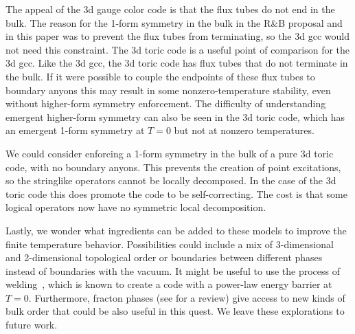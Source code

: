 The appeal of the 3d gauge color code is that the flux tubes do not end in the bulk.
The reason for the 1-form symmetry in the bulk in the R\&B proposal and in this paper was to prevent the flux tubes from terminating, so the 3d gcc would not need this constraint.
The 3d toric code is a useful point of comparison for the 3d gcc.
Like the 3d gcc, the 3d toric code has flux tubes that do not terminate in the bulk.
If it were possible to couple the endpoints of these flux tubes to boundary anyons this may result in some nonzero-temperature stability, even without higher-form symmetry enforcement. The difficulty of understanding emergent higher-form symmetry can also be seen in the 3d toric code, which has an emergent 1-form symmetry at $T=0$ but not at nonzero temperatures. 

We could consider enforcing a 1-form symmetry in the bulk of a pure 3d toric code, with no boundary anyons.
This prevents the creation of point excitations, so the stringlike operators cannot be locally decomposed. 
In the case of the 3d toric code this does promote the code to be self-correcting. The cost is that some logical operators now have no symmetric local decomposition. 

Lastly, we wonder what ingredients can be added to these models to improve the finite temperature behavior. Possibilities could include a mix of 3-dimensional and 2-dimensional topological order or boundaries between different phases instead of boundaries with the vacuum. It might be useful to use the process of welding~\cite{Michnicki2014PowerLaw}, which is known to create a code with a power-law energy barrier at $T=0$. Furthermore, fracton phases (see \cite{NandkishoreHermele2019} for a review) give access to new kinds of bulk order that could be also useful in this quest. We leave these explorations to future work. 

%
%
%